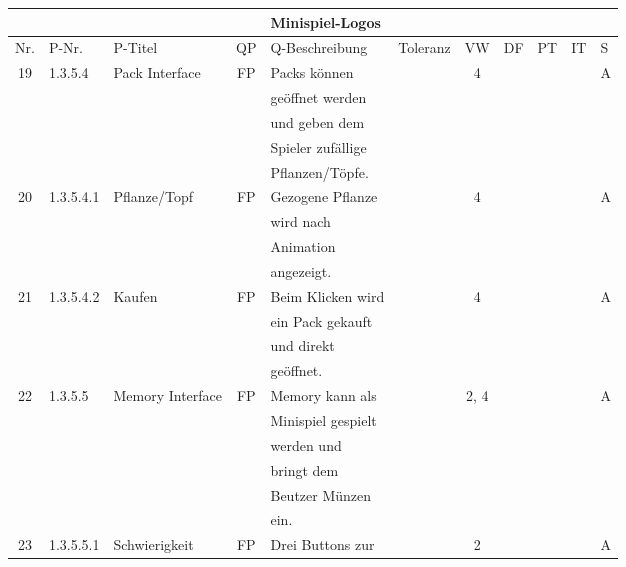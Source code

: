 \begin{longtable}{|c|l|l|c|l|l|c|c|l|l|l|}
            &       &            &    & Minispiel-Logos &   &   & & & &\\[10ex]
            \hline
            \hline
            Nr. & P-Nr. & P-Titel & QP & Q-Beschreibung & Toleranz & VW & DF & PT & IT & S \\[0.5ex]
            \hline\hline
            \hline
            19 & 1.3.5.4 & Pack Interface & FP & Packs können &  & 4 &  &  &  & A \\
            &       &            &    & geöffnet werden &   &   & & & &\\
            &       &            &    & und geben dem &   &   & & & &\\
            &       &            &    & Spieler zufällige &   &   & & & &\\
            &       &            &    & Pflanzen/Töpfe. &   &   & & & &\\
            \hline
            20 & 1.3.5.4.1 & Pflanze/Topf & FP & Gezogene Pflanze &  & 4 &  &  &  & A \\
            &       &            &    & wird nach  &   &   & & & &\\
            &       &            &    & Animation &   &   & & & &\\
            &       &            &    & angezeigt. &   &   & & & &\\
            \hline
            21 & 1.3.5.4.2 & Kaufen & FP & Beim Klicken wird  &  & 4 &  &  &  & A \\
            &       &            &    & ein Pack gekauft &   &   & & & &\\
            &       &            &    & und direkt &   &   & & & &\\
            &       &            &    & geöffnet. &   &   & & & &\\
            \hline
            22 & 1.3.5.5 & Memory Interface & FP & Memory kann als &  & 2, 4 &  &  &  & A \\
            &       &            &    & Minispiel gespielt &   &   & & & &\\
            &       &            &    & werden und  &   &   & & & &\\
            &       &            &    & bringt dem  &   &   & & & &\\
            &       &            &    & Beutzer Münzen &   &   & & & &\\
            &       &            &    & ein. &   &   & & & &\\
            \hline
            23 & 1.3.5.5.1 & Schwierigkeit & FP & Drei Buttons zur &  & 2 &  &  &  & A \\

\end{longtable}
